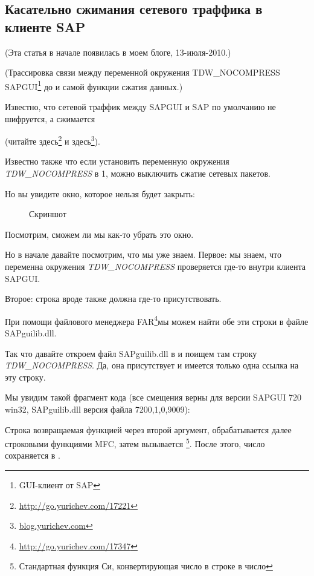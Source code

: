 \subsection{Касательно сжимания сетевого траффика в клиенте SAP}
\label{sec:SAPGUI}

(Эта статья в начале появилась в моем блоге, 13-июля-2010.)

\newcommand{\TDWNC}{TDW\_NOCOMPRESS\xspace}

(Трассировка связи между переменной окружения \TDWNC{} SAPGUI\footnote{GUI-клиент от SAP}
до  и самой функции сжатия данных.)

Известно, что сетевой траффик между SAPGUI и SAP по умолчанию не шифруется, а сжимается 

(читайте здесь\footnote{\url{http://go.yurichev.com/17221}} 
и здесь\footnote{\href{http://go.yurichev.com/17225}{blog.yurichev.com}}). 

Известно также что если установить переменную окружения \emph{\TDWNC} в 1, можно выключить сжатие сетевых пакетов.

Но вы увидите окно, которое нельзя будет закрыть:

\begin{figure}[H]
\centering
{}
\caption{Скриншот}
\end{figure}

Посмотрим, сможем ли мы как-то убрать это окно.

Но в начале давайте посмотрим, что мы уже знаем.
Первое: мы знаем, что переменна окружения \emph{\TDWNC} проверяется где-то внутри клиента SAPGUI.

Второе: строка вроде  также должна где-то присутствовать.

\newcommand{\FNURLFAR}{\footnote{\url{http://go.yurichev.com/17347}}}
При помощи файлового менеджера FAR\FNURLFAR мы можем найти обе эти строки в файле SAPguilib.dll.

Так что давайте откроем файл SAPguilib.dll в \IDA и поищем там строку \emph{\TDWNC}.
Да, она присутствует и имеется только одна ссылка на эту строку.

Мы увидим такой фрагмент кода
(все смещения верны для версии SAPGUI 720 win32, SAPguilib.dll версия файла 7200,1,0,9009):



Строка возвращаемая функцией  через второй аргумент, обрабатывается далее строковыми
функциями MFC, затем вызывается \footnote{Стандартная функция Си, конвертирующая число в строке в число}.
После этого, число сохраняется в .

